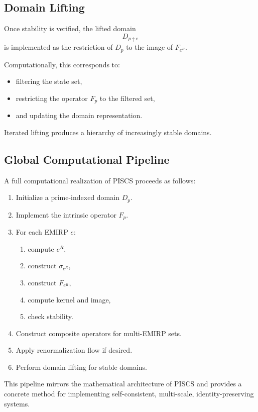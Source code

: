 \documentclass[11pt]{article}
\theoremstyle{definition}
\theoremstyle{plain}
\theoremstyle{remark}
\begin{document}
\subsection{Domain Lifting}

Once stability is verified, the lifted domain
\[
D_{p \uparrow e}
\]
is implemented as the restriction of $D_p$ to the image of $F_{e^R}$.

Computationally, this corresponds to:

\begin{itemize}
    \item filtering the state set,
    \item restricting the operator $F_p$ to the filtered set,
    \item and updating the domain representation.
\end{itemize}

Iterated lifting produces a hierarchy of increasingly stable domains.

\subsection{Global Computational Pipeline}

A full computational realization of PISCS proceeds as follows:

\begin{enumerate}
    \item Initialize a prime-indexed domain $D_p$.
    \item Implement the intrinsic operator $F_p$.
    \item For each EMIRP $e$:
    \begin{enumerate}
        \item compute $e^R$,
        \item construct $\sigma_{e^R}$,
        \item construct $F_{e^R}$,
        \item compute kernel and image,
        \item check stability.
    \end{enumerate}
    \item Construct composite operators for multi-EMIRP sets.
    \item Apply renormalization flow if desired.
    \item Perform domain lifting for stable domains.
\end{enumerate}

This pipeline mirrors the mathematical architecture of PISCS and
provides a concrete method for implementing self-consistent,
multi-scale, identity-preserving systems.
\end{document}
